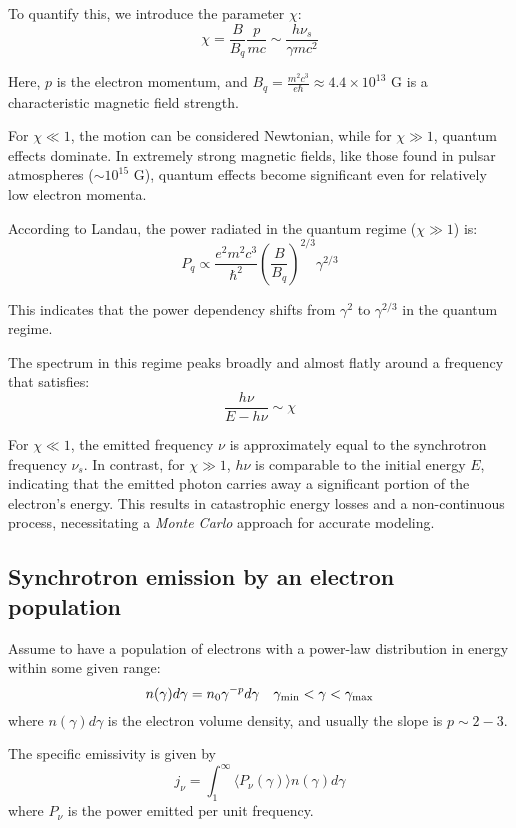 To quantify this, we introduce the parameter \( \chi \):
%
\[
\chi = \frac{B}{B_q}\frac{p}{mc} \sim \frac{h\nu_s}{\gamma mc^2}
\]

Here, \( p \) is the electron momentum, and \( B_q = \frac{m^2 c^3}{e \hbar} \approx 4.4 \times 10^{13} \) G is a characteristic magnetic field strength.

For \( \chi \ll 1 \), the motion can be considered Newtonian, while for \( \chi \gg 1 \), quantum effects dominate. In extremely strong magnetic fields, like those found in pulsar atmospheres (\( \sim 10^{15} \) G), quantum effects become significant even for relatively low electron momenta.

According to Landau, the power radiated in the quantum regime (\( \chi \gg 1 \)) is:
%
\[
P_q \propto \frac{e^2 m^2 c^3}{\hbar^2} \left( \frac{B}{B_q}\right)^{2/3} \gamma^{2/3}
\]

This indicates that the power dependency shifts from \( \gamma^2 \) to \( \gamma^{2/3} \) in the quantum regime.

The spectrum in this regime peaks broadly and almost flatly around a frequency that satisfies:
%
\[
\frac{h\nu}{E - h\nu} \sim \chi
\]

For \( \chi \ll 1 \), the emitted frequency \( \nu \) is approximately equal to the synchrotron frequency \( \nu_s \). In contrast, for \( \chi \gg 1 \), \( h\nu \) is comparable to the initial energy \( E \), indicating that the emitted photon carries away a significant portion of the electron's energy. This results in catastrophic energy losses and a non-continuous process, necessitating a \emph{Monte Carlo} approach for accurate modeling.

\subsection{Synchrotron emission by an electron population}

Assume to have a population of electrons with a power-law distribution in energy within some given range:
%
\[
n(\gamma) d\gamma = n_0 \gamma^{-p} d\gamma \quad \gamma_{\rm min} < \gamma < \gamma_{\rm max} 
\]	
%
where $n(\gamma) d\gamma$ is the electron volume density, and usually the slope is $p \sim 2-3$.

The specific emissivity is given by
%
\begin{equation*}
j_\nu = \int_1^\infty \langle P_\nu(\gamma) \rangle n(\gamma) d\gamma
\end{equation*}
%
where $P_\nu$ is the power emitted per unit frequency.

